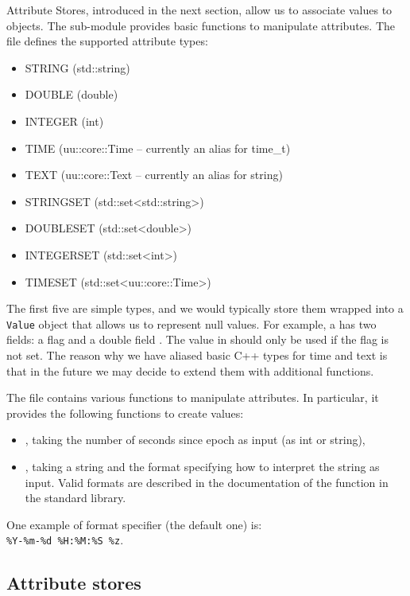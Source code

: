 Attribute Stores, introduced in the next section, allow us to associate values to objects. The sub-module  provides basic functions to manipulate attributes. The file  defines the supported attribute types:
\begin{itemize}
    \item STRING (std::string)
    \item DOUBLE (double)
    \item INTEGER (int)
    \item TIME (uu::core::Time -- currently an alias for time\_t)
    \item TEXT (uu::core::Text -- currently an alias for string)
    \item STRINGSET (std::set<std::string>)
    \item DOUBLESET (std::set<double>)
    \item INTEGERSET (std::set<int>)
    \item TIMESET (std::set<uu::core::Time>)
\end{itemize}

The first five are simple types, and we would typically store them wrapped into a \texttt{Value} object that allows us to represent null values. For example, a  has two fields: a flag  and a double field . The value in  should only be used if the  flag is not set. The reason why we have aliased basic C++ types for time and text is that in the future we may decide to extend them with additional functions.

The file  contains various functions to manipulate attributes. In particular, it provides the following functions to create  values:
\begin{itemize}
    \item {}, taking the number of seconds since epoch as input (as int or string),
    \item {}, taking a string and the format specifying how to interpret the string as input. Valid formats are described in the documentation of the  function in the standard library.
\end{itemize}
One example of format specifier (the default one) is:\\ \texttt{\%Y-\%m-\%d~\%H:\%M:\%S~\%z}.

\subsection{Attribute stores} \label{ch:core:attr}

